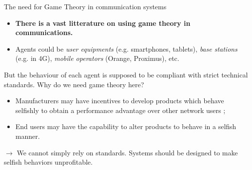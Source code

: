 \usetikzlibrary{calc}
\usetikzlibrary{decorations.pathreplacing,decorations.markings,shapes.geometric}

\newcommand{\BS}[1]{%
	\begin{tikzpicture}
		\node[station] (base) {#1};
		\draw[line join=bevel] (base.100) -- (base.80) -- (base.110) -- (base.70) -- (base.north west)
        -- (base.north east);
		\draw[line join=bevel] (base.100) -- (base.70) (base.110) -- (base.north east);
		\draw[line cap=rect] ([yshift=0pt]base.north) [antenna=1];
	\end{tikzpicture}
}

\newcommand{\UE}[1]{%
	\begin{tikzpicture}
        \node (ue) {$\underset{#1}{\smartphone}$};
	\end{tikzpicture}
}



\begin{frame}{The need for Game Theory in communication systems}
    \begin{itemize}
        \item \textbf{There is a vast litterature on using game theory in communications.}
        \item Agents could be \textit{user equipments} (e.g. smartphones, tablets),
        \textit{base stations} (e.g. in 4G), \textit{mobile operators} (Orange, Proximus), etc.
    \end{itemize}

    \pause
    \begin{alertblock}{But the behaviour of each agent is supposed to be compliant with strict
    technical standards. Why do we need game theory here?}
        \begin{itemize}
            \pause
            \item Manufacturers may have incentives to develop products which behave selfishly
            to obtain a performance advantage over other network users ;
            \pause
            \item End users may have the capability to alter products to behave in a selfish
            manner.
        \end{itemize}
    \end{alertblock}

    \pause
    $\to$ We cannot simply rely on standards. {\color{green}Systems should be designed to
    make selfish behaviors unprofitable.}
\end{frame}


